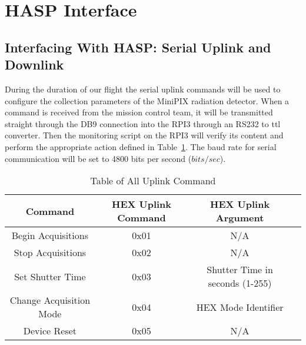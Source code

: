 \section{HASP Interface}
\label{sec:Hasp-Interface}

\subsection{Interfacing With HASP: Serial Uplink and Downlink}
During the duration of our flight the serial uplink commands will be used to configure the collection parameters of the MiniPIX radiation detector. When a command is received from the mission control team, it will be transmitted straight through the DB9 connection into the RPI3 through an RS232 to ttl converter. Then the monitoring script on the RPI3 will verify its content and perform the appropriate action defined in Table~\ref{tab:All-Commands}. The baud rate for serial communication will be set to 4800 bits per second ($bits/sec$). 


\begin{table}[!ht]
\centering
\caption{Table of All Uplink Command} 
\label{tab:All-Commands}
\bigskip
\begin{tabular}{|c|c|c|c|}
\hline
\multicolumn{1}{|c|}{\bfseries Command} & \multicolumn{1}{c|}{\bfseries HEX Uplink Command} & \multicolumn{1}{c|}{\bfseries HEX Uplink Argument}\\
\hline
    Begin Acquisitions 		& 0x01	 & N/A			    	    \\ \hline 
    Stop Acquisitions 		& 0x02	 & N/A			            \\ \hline
    Set Shutter Time		& 0x03   & Shutter Time in seconds (1-255)  \\ \hline %
    Change Acquisition Mode    	& 0x04 	 & HEX Mode Identifier 	            \\ \hline
    Device Reset		& 0x05 	 & N/A				    \\ \hline
    
\end{tabular}
\medskip
\end{table}

